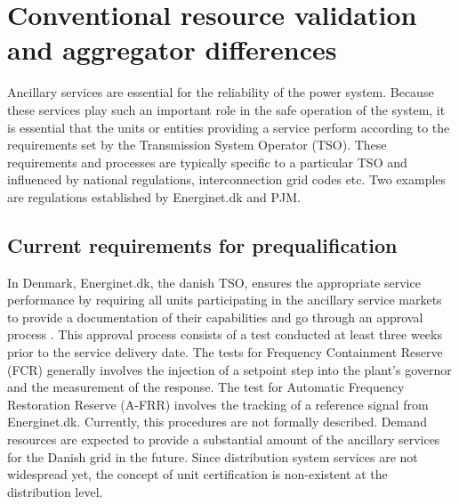 \section{Conventional resource validation and aggregator differences}
Ancillary services are essential for the reliability of the power system. Because these services play such an important role in the safe operation of the system, it is essential that the units or entities providing a service perform according to the requirements set by the Transmission System Operator (TSO). These requirements and processes are typically specific to a particular TSO and influenced by national regulations, interconnection grid codes etc. Two examples are regulations established by Energinet.dk and PJM.
\subsection{Current requirements for prequalification}\label{sec:PSSCCconventionalvalidation}
In Denmark, Energinet.dk, the danish TSO, ensures the appropriate service performance by requiring all units participating in the ancillary service markets to provide a documentation of their capabilities and go through an approval process \cite{energinet2012ancillary}. This approval process consists of a test conducted at least three weeks prior to the service delivery date. The tests for Frequency Containment Reserve (FCR) generally involves the injection of a setpoint step into the plant's governor and the measurement of the response. The test for Automatic Frequency Restoration Reserve (A-FRR) involves the tracking of a reference signal from Energinet.dk. Currently, this procedures are not formally described.
Demand resources are expected to provide a substantial amount of the ancillary services for the Danish grid in the future. Since distribution system services are not widespread yet, the concept of unit certification is non-existent at the distribution level. 

